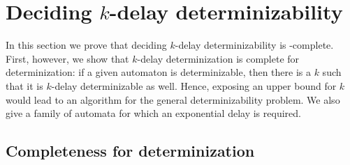 \documentclass[a4paper]{article}
\begin{document}
\section{Deciding $k$-delay determinizability}
\label{sec:kdelay}
In this section we prove that deciding $k$-delay determinizability is
\EXP-complete.
First, however, we show that $k$-delay determinization is complete for
determinization: if a given automaton is determinizable, then there is a $k$
such that it is $k$-delay determinizable as well. Hence, exposing an upper bound
for $k$ would lead to an algorithm for the general determinizability problem. We
also give a family of automata for which an exponential delay is required.

\subsection{Completeness for determinization}
\label{sec:semialgo}
\end{document}
